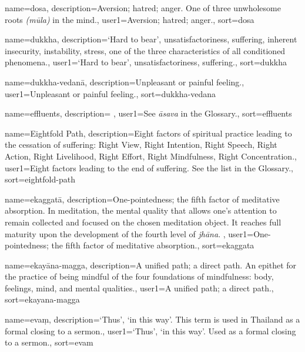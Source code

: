 {
name={dosa},
description={Aversion; hatred; anger. One of three unwholesome roots \textit{(m\=ula)} in the mind.},
user1={Aversion; hatred; anger.},
sort={dosa}
}

{
name=dukkha,
description={`Hard to bear', unsatisfactoriness, suffering, inherent insecurity, instability, stress, one of the three characteristics of all conditioned phenomena.},
user1={`Hard to bear', unsatisfactoriness, suffering.},
sort={dukkha}
}

{
name=dukkha-vedan\=a,
description={Unpleasant or painful feeling.},
user1={Unpleasant or painful feeling.},
sort={dukkha-vedana}
}

{
name={effluents},
description={\nopostdesc \protect \seepre %
\protect {}%
\protect \seepost %
},
user1={See \textit{\=asava} in the Glossary.},
sort={effluents}
}

{
name=Eightfold Path,
description={Eight factors of spiritual practice leading to the cessation of suffering: Right View, Right Intention, Right Speech, Right Action, Right Livelihood, Right Effort, Right Mindfulness, Right Concentration.},
user1={Eight factors leading to the end of suffering. See the list in the Glossary.},
sort={eightfold-path}
}

{
name=ekaggat\=a,
description={One-pointedness; the fifth factor of meditative absorption. In meditation, the mental quality that allows one's attention to remain collected and focused on the chosen meditation object. It reaches full maturity upon the development of the fourth level of \textit{jh\=ana}. \protect \seepre %
\protect {}%
\protect \seepost %
},
user1={One-pointedness; the fifth factor of meditative absorption.},
sort={ekaggata}
}

{
name={ekay\=ana-magga},
description={A unified path; a direct path. An epithet for the practice of being mindful of the four foundations of mindfulness: body, feelings, mind, and mental qualities.},
user1={A unified path; a direct path.},
sort={ekayana-magga}
}

{
name={eva\d{m}},
description={`Thus', `in this way'. This term is used in Thailand as a formal closing to a sermon.},
user1={`Thus', `in this way'. Used as a formal closing to a sermon.},
sort={evam}
}

